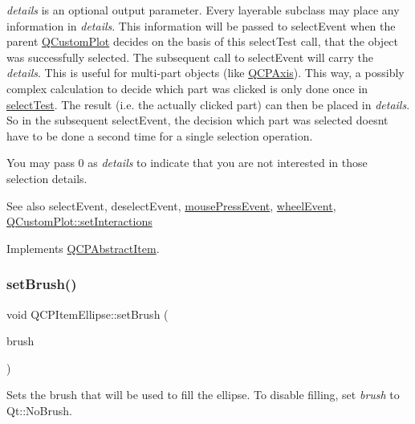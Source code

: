 {\itshape details} is an optional output parameter. Every layerable subclass may place any information in {\itshape details}. This information will be passed to select\+Event when the parent \hyperlink{class_q_custom_plot}{Q\+Custom\+Plot} decides on the basis of this select\+Test call, that the object was successfully selected. The subsequent call to select\+Event will carry the {\itshape details}. This is useful for multi-\/part objects (like \hyperlink{class_q_c_p_axis}{Q\+C\+P\+Axis}). This way, a possibly complex calculation to decide which part was clicked is only done once in \hyperlink{class_q_c_p_item_ellipse_ab6e2b8a29695c606c7731e498297ca29}{select\+Test}. The result (i.\+e. the actually clicked part) can then be placed in {\itshape details}. So in the subsequent select\+Event, the decision which part was selected doesn\textquotesingle{}t have to be done a second time for a single selection operation.

You may pass 0 as {\itshape details} to indicate that you are not interested in those selection details.

\begin{DoxySeeAlso}{See also}
select\+Event, deselect\+Event, \hyperlink{class_q_c_p_layerable_af6567604818db90f4fd52822f8bc8376}{mouse\+Press\+Event}, \hyperlink{class_q_c_p_layerable_a47dfd7b8fd99c08ca54e09c362b6f022}{wheel\+Event}, \hyperlink{class_q_custom_plot_a5ee1e2f6ae27419deca53e75907c27e5}{Q\+Custom\+Plot\+::set\+Interactions} 
\end{DoxySeeAlso}


Implements \hyperlink{class_q_c_p_abstract_item_ae41d0349d68bb802c49104afd100ba2a}{Q\+C\+P\+Abstract\+Item}.

\mbox{\label{class_q_c_p_item_ellipse_a49fc74e6965834e873d027d026def798}} 
\subsubsection{\texorpdfstring{set\+Brush()}{setBrush()}}
{\footnotesize\ttfamily void Q\+C\+P\+Item\+Ellipse\+::set\+Brush (\begin{DoxyParamCaption}\item[{const Q\+Brush \&}]{brush }\end{DoxyParamCaption})}

Sets the brush that will be used to fill the ellipse. To disable filling, set {\itshape brush} to Qt\+::\+No\+Brush.

